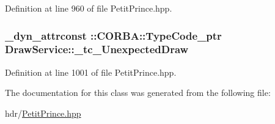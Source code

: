 Definition at line 960 of file Petit\+Prince.\+hpp.

\subsubsection[{\texorpdfstring{\+\_\+tc\+\_\+\+Unexpected\+Draw}{_tc_UnexpectedDraw}}]{\setlength{\rightskip}{0pt plus 5cm}\+\_\+dyn\+\_\+attrconst \+::C\+O\+R\+B\+A\+::\+Type\+Code\+\_\+ptr Draw\+Service\+::\+\_\+tc\+\_\+\+Unexpected\+Draw\hspace{0.3cm}{\ttfamily [static]}}\hypertarget{class_draw_service_a20a8de19b0f9d322579bf636ca2dd1e6}{}\label{class_draw_service_a20a8de19b0f9d322579bf636ca2dd1e6}


Definition at line 1001 of file Petit\+Prince.\+hpp.



The documentation for this class was generated from the following file\+:\begin{DoxyCompactItemize}
\item 
hdr/\hyperlink{_petit_prince_8hpp}{Petit\+Prince.\+hpp}\end{DoxyCompactItemize}
